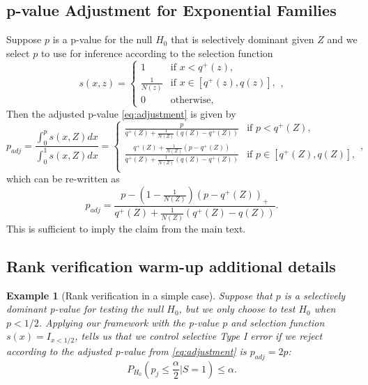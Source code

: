 \documentclass{article}
\newtheorem{example}{Example}
\begin{document}
\begin{appendix}
\subsection{p-value Adjustment for Exponential Families}
\label{sec:rank_verficiation_adj_appdx}

Suppose $p$ is a p-value for the null $H_0$ that is selectively dominant given $Z$ and we select $p$ to use for inference according to the selection function 
    \begin{equation*}
        s(x, z) = 
        \begin{cases} 
        1 & \text{if } x < q^+(z), \\
        \frac{1}{N(z)} & \text{if } x \in [q^+(z), q(z)], \\
        0 & \text{otherwise},
        \end{cases},
    \end{equation*}
Then the adjusted p-value \eqref{eq:adjustment} is given by 
\begin{equation*}
    p_{adj} = \frac{\int_0^p s(x, Z) dx }{\int_0^1 s(x, Z)dx} = 
        \begin{cases} 
        \frac{p}{q^{+}(Z) + \frac{1}{N(Z)}(q(Z) - q^{+}(Z)) }  & \text{if } p  < q^+(Z), \\
        \frac{q^{+}(Z)+ \frac{1}{N(Z)}(p - q^{+}(Z))}{q^{+}(Z) + \frac{1}{N(Z)}(q(Z) - q^{+}(Z)) } & \text{if } p \in [q^+(Z), q(Z)], \\
        \end{cases},
\end{equation*}
which can be re-written as 
\begin{equation*}
   p_{adj} = \frac{p - (1-\frac{1}{N(Z)})(p - q^+(Z))_+ }{q^+(Z) + \frac{1}{N(Z)}(q^+(Z) - q(Z))}.
\end{equation*}
This is sufficient to imply the claim from the main text. 


\subsection{Rank verification warm-up additional details}
\label{sec:rank_verification_warm_up_appdx}

\begin{example}[Rank verification in a simple case]
    \label{exm:rank_verification}
    Suppose that $p$ is a selectively dominant p-value for testing the null $H_0$, but we only choose to test $H_0$ when $p < 1/2$. Applying our framework with the p-value $p$ and selection function $s(x) = I_{x < 1/2}$,  tells us that we control selective Type I error if we reject according to the adjusted p-value from \eqref{eq:adjustment} is $p_{adj} = 2p$:
    \begin{equation}
        \label{eq:rank_verification_error_control}
        P_{H_{0}}\left(p_j \leq \frac{\alpha}{2} | S = 1\right) \leq \alpha.
    \end{equation} 
    

\end{example}
\end{appendix}
\end{document}
